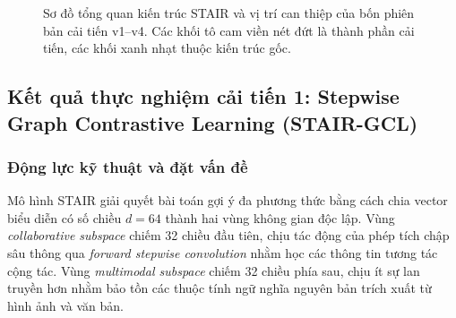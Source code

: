 \begin{figure}[H]
\caption[Sơ đồ tổng quan kiến trúc STAIR và bốn phiên bản cải tiến]{Sơ đồ tổng quan kiến trúc STAIR và vị trí can thiệp của bốn phiên bản cải tiến v1--v4. Các khối tô cam viền nét đứt là thành phần cải tiến, các khối xanh nhạt thuộc kiến trúc gốc.}
\label{fig:stair_overview}
\end{figure}

\subsection{Kết quả thực nghiệm cải tiến 1: Stepwise Graph Contrastive Learning (STAIR-GCL)}


\subsubsection{Động lực kỹ thuật và đặt vấn đề}

Mô hình STAIR giải quyết bài toán gợi ý đa phương thức bằng cách chia vector biểu diễn có số chiều $d=64$ thành hai vùng không gian độc lập. Vùng \textit{collaborative subspace} chiếm 32 chiều đầu tiên, chịu tác động của phép tích chập sâu thông qua \textit{forward stepwise convolution} nhằm học các thông tin tương tác cộng tác. Vùng \textit{multimodal subspace} chiếm 32 chiều phía sau, chịu ít sự lan truyền hơn nhằm bảo tồn các thuộc tính ngữ nghĩa nguyên bản trích xuất từ hình ảnh và văn bản.

